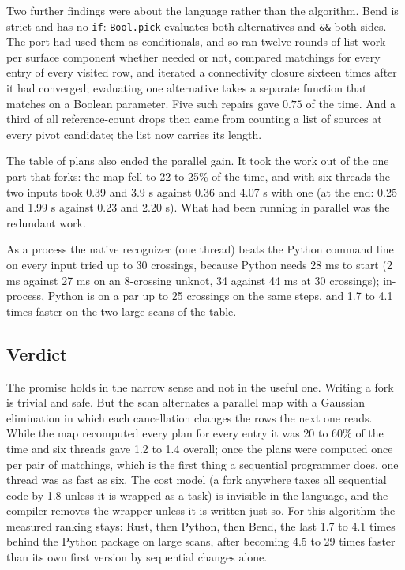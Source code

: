 Two further findings were about the language rather than the algorithm. Bend
is strict and has no \texttt{if}: \texttt{Bool.pick} evaluates both alternatives
and \texttt{\&\&} both sides. The port had used them as conditionals, and so ran
twelve rounds of list work per surface component whether needed or not,
compared matchings for every entry of every visited row, and iterated a
connectivity closure sixteen times after it had converged; evaluating one
alternative takes a separate function that matches on a Boolean parameter.
Five such repairs gave $0.75$ of the time. And a third of all reference-count
drops then came from counting a list of sources at every pivot candidate; the
list now carries its length.

The table of plans also ended the parallel gain. It took the work out of the one part
that forks: the map fell to 22 to 25\% of the time, and with six threads the two
inputs took 0.39 and 3.9 s against 0.36 and 4.07 s with one (at the end: 0.25
and 1.99 s against 0.23 and 2.20 s). What had been
running in parallel was the redundant work.

As a process the native recognizer (one thread) beats the Python command line
on every input tried up to 30 crossings, because Python needs 28 ms to start
(2 ms against 27 ms on an 8-crossing unknot, 34 against 44 ms at 30 crossings);
in-process, Python is on a par up to 25 crossings on the same steps, and 1.7 to
4.1 times faster on the two large scans of the table.

\subsection{Verdict}
The promise holds in the narrow sense and not in the useful one. Writing a fork
is trivial and safe. But the scan alternates a parallel map with a Gaussian
elimination in which each cancellation changes the rows the next one reads.
While the map recomputed every plan for every entry it was 20 to 60\% of the
time and six threads gave 1.2 to 1.4 overall; once the plans were computed once
per pair of matchings, which is the first thing a sequential programmer does,
one thread was as fast as six. The cost model (a fork anywhere taxes all
sequential code by 1.8 unless it is wrapped as a task) is invisible in the
language, and the compiler removes the wrapper unless it is written just so.
For this algorithm the measured ranking stays: Rust, then Python, then Bend,
the last 1.7 to 4.1 times behind the Python package on large scans, after
becoming 4.5 to 29 times faster than its own first version by sequential changes
alone.
